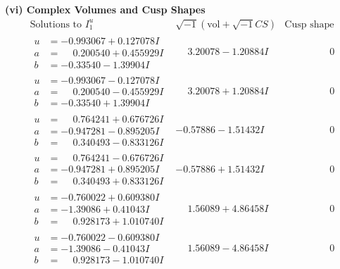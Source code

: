 \documentclass[1p]{elsarticle_modified}
\theoremstyle{definition}
\newcommand{\I}{\sqrt{-1}}
\begin{document}
\newpage\flushleft \textbf{(vi) Complex Volumes and Cusp Shapes}
$$\begin{array}{c|c|c}  
\text{Solutions to }I^u_{1}& \I (\text{vol} + \sqrt{-1}CS) & \text{Cusp shape}\\
 \hline 
\begin{aligned}
u &= -0.993067 + 0.127078 I \\
a &= \phantom{-}0.200540 + 0.455929 I \\
b &= -0.33540 - 1.39904 I\end{aligned}
 & \phantom{-}3.20078 - 1.20884 I & \phantom{-0.000000 } 0 \\ \hline\begin{aligned}
u &= -0.993067 - 0.127078 I \\
a &= \phantom{-}0.200540 - 0.455929 I \\
b &= -0.33540 + 1.39904 I\end{aligned}
 & \phantom{-}3.20078 + 1.20884 I & \phantom{-0.000000 } 0 \\ \hline\begin{aligned}
u &= \phantom{-}0.764241 + 0.676726 I \\
a &= -0.947281 - 0.895205 I \\
b &= \phantom{-}0.340493 - 0.833126 I\end{aligned}
 & -0.57886 - 1.51432 I & \phantom{-0.000000 } 0 \\ \hline\begin{aligned}
u &= \phantom{-}0.764241 - 0.676726 I \\
a &= -0.947281 + 0.895205 I \\
b &= \phantom{-}0.340493 + 0.833126 I\end{aligned}
 & -0.57886 + 1.51432 I & \phantom{-0.000000 } 0 \\ \hline\begin{aligned}
u &= -0.760022 + 0.609380 I \\
a &= -1.39086 + 0.41043 I \\
b &= \phantom{-}0.928173 + 1.010740 I\end{aligned}
 & \phantom{-}1.56089 + 4.86458 I & \phantom{-0.000000 } 0 \\ \hline\begin{aligned}
u &= -0.760022 - 0.609380 I \\
a &= -1.39086 - 0.41043 I \\
b &= \phantom{-}0.928173 - 1.010740 I\end{aligned}
 & \phantom{-}1.56089 - 4.86458 I & \phantom{-0.000000 } 0 \\ \hline\begin{aligned}

\end{aligned}
\end{array}$$
\end{document}
